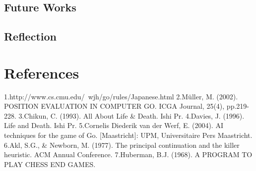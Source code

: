 \documentclass{l4proj}
\begin{document}
\section{Future Works}

\section{Reflection}


\chapter{References}
1.http://www.cs.cmu.edu/~wjh/go/rules/Japanese.html
2.Müller, M. (2002). POSITION EVALUATION IN COMPUTER GO. ICGA Journal, 25(4), pp.219-228.
3.Chikun, C. (1993). All About Life & Death. Ishi Pr.
4.Davies, J. (1996). Life and Death. Ishi Pr.
5.Cornelis Diederik van der Werf, E. (2004). AI techniques for the game of Go. [Maastricht]: UPM, Universitaire Pers Maastricht.
6.Akl, S.G., & Newborn, M. (1977). The principal continuation and the killer heuristic. ACM Annual Conference.
7.Huberman, B.J. (1968). A PROGRAM TO PLAY CHESS END GAMES.
\end{document}
